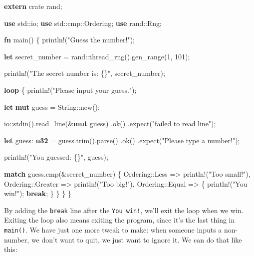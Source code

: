 \documentclass[a4paper,]{book}
\newenvironment{Shaded}{\begin{snugshade}}{\end{snugshade}}
\newcommand{\KeywordTok}[1]{\textcolor[rgb]{0.13,0.29,0.53}{\textbf{{#1}}}}
\newcommand{\DecValTok}[1]{\textcolor[rgb]{0.00,0.00,0.81}{{#1}}}
\newcommand{\StringTok}[1]{\textcolor[rgb]{0.31,0.60,0.02}{{#1}}}
\newcommand{\OtherTok}[1]{\textcolor[rgb]{0.56,0.35,0.01}{{#1}}}
\newcommand{\NormalTok}[1]{{#1}}
\begin{document}
\begin{Shaded}
\begin{Highlighting}[]
\KeywordTok{extern} \NormalTok{crate rand;}

\KeywordTok{use} \NormalTok{std::io;}
\KeywordTok{use} \NormalTok{std::cmp::Ordering;}
\KeywordTok{use} \NormalTok{rand::Rng;}

\KeywordTok{fn} \NormalTok{main() \{}
    \OtherTok{println!}\NormalTok{(}\StringTok{"Guess the number!"}\NormalTok{);}

    \KeywordTok{let} \NormalTok{secret_number = rand::thread_rng().gen_range(}\DecValTok{1}\NormalTok{, }\DecValTok{101}\NormalTok{);}

    \OtherTok{println!}\NormalTok{(}\StringTok{"The secret number is: \{\}"}\NormalTok{, secret_number);}

    \KeywordTok{loop} \NormalTok{\{}
        \OtherTok{println!}\NormalTok{(}\StringTok{"Please input your guess."}\NormalTok{);}

        \KeywordTok{let} \KeywordTok{mut} \NormalTok{guess = String::new();}

        \NormalTok{io::stdin().read_line(&}\KeywordTok{mut} \NormalTok{guess)}
            \NormalTok{.ok()}
            \NormalTok{.expect(}\StringTok{"failed to read line"}\NormalTok{);}

        \KeywordTok{let} \NormalTok{guess: }\KeywordTok{u32} \NormalTok{= guess.trim().parse()}
            \NormalTok{.ok()}
            \NormalTok{.expect(}\StringTok{"Please type a number!"}\NormalTok{);}

        \OtherTok{println!}\NormalTok{(}\StringTok{"You guessed: \{\}"}\NormalTok{, guess);}

        \KeywordTok{match} \NormalTok{guess.cmp(&secret_number) \{}
            \NormalTok{Ordering::Less    => }\OtherTok{println!}\NormalTok{(}\StringTok{"Too small!"}\NormalTok{),}
            \NormalTok{Ordering::Greater => }\OtherTok{println!}\NormalTok{(}\StringTok{"Too big!"}\NormalTok{),}
            \NormalTok{Ordering::Equal   => \{}
                \OtherTok{println!}\NormalTok{(}\StringTok{"You win!"}\NormalTok{);}
                \KeywordTok{break}\NormalTok{;}
            \NormalTok{\}}
        \NormalTok{\}}
    \NormalTok{\}}
\NormalTok{\}}
\end{Highlighting}
\end{Shaded}

By adding the \texttt{break} line after the \texttt{You\ win!}, we'll
exit the loop when we win. Exiting the loop also means exiting the
program, since it's the last thing in \texttt{main()}. We have just one
more tweak to make: when someone inputs a non-number, we don't want to
quit, we just want to ignore it. We can do that like this:
\end{document}
